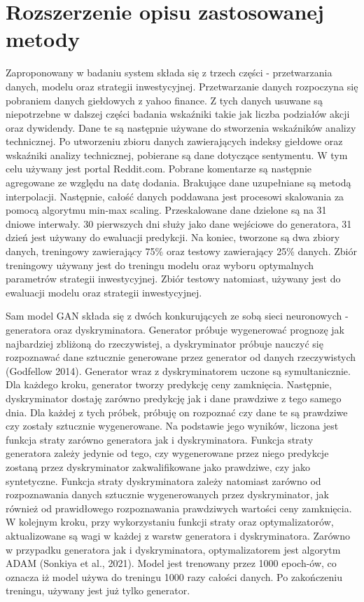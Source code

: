 \documentclass[11pt]{article} %
\begin{document}
\section{Rozszerzenie opisu zastosowanej metody}

Zaproponowany w badaniu system składa się z trzech części -  przetwarzania danych, modelu oraz strategii inwestycyjnej. Przetwarzanie danych rozpoczyna się pobraniem danych giełdowych z yahoo finance. Z tych danych usuwane są niepotrzebne w dalszej części badania wskaźniki takie jak liczba podziałów akcji oraz dywidendy. Dane te są następnie używane do stworzenia wskaźników analizy technicznej. Po utworzeniu zbioru danych zawierających indeksy giełdowe oraz wskaźniki analizy technicznej, pobierane są dane dotyczące sentymentu. W tym celu używany jest portal Reddit.com. Pobrane komentarze są następnie agregowane ze względu na datę dodania. Brakujące dane uzupełniane są metodą interpolacji. Następnie, całość danych poddawana jest procesowi skalowania za pomocą algorytmu min-max scaling. Przeskalowane dane dzielone są na 31 dniowe interwały. 30 pierwszych dni służy jako dane wejściowe do generatora, 31 dzień jest używany do ewaluacji predykcji. Na koniec, tworzone są dwa zbiory danych, treningowy zawierający 75\% oraz testowy zawierający 25\% danych. Zbiór treningowy używany jest do treningu modelu oraz wyboru optymalnych parametrów strategii inwestycyjnej. Zbiór testowy natomiast, używany jest do ewaluacji modelu oraz strategii inwestycyjnej. 


Sam model GAN składa się z dwóch konkurujących ze sobą sieci neuronowych - generatora oraz dyskryminatora. Generator próbuje wygenerować prognozę jak najbardziej zbliżoną do rzeczywistej, a dyskryminator próbuje nauczyć się rozpoznawać dane sztucznie generowane przez generator od danych rzeczywistych (Godfellow 2014). Generator wraz z dyskryminatorem uczone są symultanicznie. Dla każdego kroku, generator tworzy predykcję ceny zamknięcia. Następnie, dyskryminator dostaję zarówno predykcję jak i dane prawdziwe z tego samego dnia. Dla każdej z tych próbek, próbuję on rozpoznać czy dane te są prawdziwe czy zostały sztucznie wygenerowane. Na podstawie jego wyników, liczona jest funkcja straty zarówno generatora jak i dyskryminatora. Funkcja straty generatora zależy jedynie od tego, czy wygenerowane przez niego predykcje zostaną przez dyskryminator zakwalifikowane jako prawdziwe, czy jako syntetyczne. Funkcja straty dyskryminatora zależy natomiast zarówno od rozpoznawania danych sztucznie wygenerowanych przez dyskryminator, jak również od prawidłowego rozpoznawania prawdziwych wartości ceny zamknięcia. W kolejnym kroku, przy wykorzystaniu funkcji straty oraz optymalizatorów, aktualizowane są wagi w każdej z warstw generatora i dyskryminatora. Zarówno w przypadku generatora jak i dyskryminatora, optymalizatorem jest algorytm ADAM (Sonkiya et al., 2021).  Model jest trenowany przez 1000 epoch-ów, co oznacza iż model używa do treningu 1000 razy całości danych. Po zakończeniu treningu, używany jest już tylko generator. 
\end{document}
